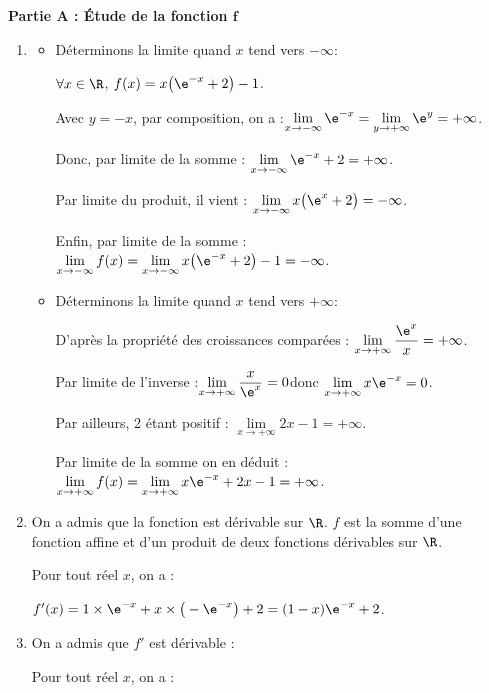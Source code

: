 \medskip

\textbf{Partie A : Étude de la fonction $\boldsymbol{f}$}

\begin{enumerate}
\item
\begin{itemize}
\item Déterminons la limite quand $x$ tend vers $-\infty$:

$\forall x \in \R$, \quad $f(x) = x\big(\e^{-x} + 2\big) - 1$.

Avec $y = -x$, par composition, on a :\quad $\lim\limits_{x \to -\infty} \e^{-x}= \lim\limits_{y \to +\infty} \e^{y} = +\infty$.

Donc, par limite de la somme : \quad $\lim\limits_{x \to -\infty} \e^{-x} + 2 = +\infty$.

Par limite du produit, il vient : \quad $\lim\limits_{x \to -\infty} x\big(\e^{x} + 2\big) = -\infty$.

Enfin, par limite de la somme : \quad $\lim\limits_{x \to -\infty} f(x) = \lim\limits_{x \to -\infty} x\big(\e^{-x} + 2\big) - 1 = -\infty$.

\item Déterminons la limite quand $x$ tend vers $+\infty$:

D'après la propriété des croissances comparées : \quad$ \lim\limits_{x \to +\infty} \dfrac{\e^{x}}{x} = +\infty$.

Par limite de l'inverse :\quad$\lim\limits_{x \to +\infty} \dfrac{x}{\e^{x}} = 0$\quad donc $\lim\limits_{x \to +\infty} x\e^{-x} = 0$.

Par ailleurs, 2 étant positif : \quad $\lim\limits_{x \to +\infty}2x-1 = +\infty$.

Par limite de la somme on en déduit :\quad $\lim\limits_{x \to +\infty} f(x) = \lim\limits_{x \to +\infty} x\e^{-x} + 2 x-1 = +\infty$.
\end{itemize}

\item On a admis que la fonction est dérivable sur $\R$. $f$ est la somme d'une fonction affine et d'un produit de deux fonctions dérivables sur $\R$.

Pour tout réel $x$, on a :

$f'(x) = 1 \times \e^{-x} + x \times \big(-\e^{-x}\big) + 2 = (1 - x)\e^{-x} + 2$.

\item On a admis que $f'$ est dérivable :

Pour tout réel $x$, on a :


\end{enumerate}
